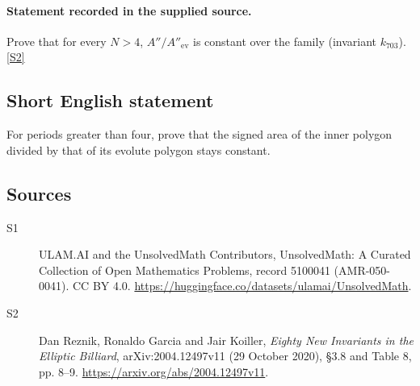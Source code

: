 \documentclass[11pt]{article}
\newcommand{\sref}[2]{\hyperlink{source:#1:#2}{[S#2]}}
\begin{document}
\paragraph{Statement recorded in the supplied source.}
Prove that for every $N>4$, $A''/A''_{\mathrm{ev}}$ is constant over the family (invariant $k_{703}$). \sref{5100041}{2}
\subsection{Short English statement}
For periods greater than four, prove that the signed area of the inner polygon divided by that of its evolute polygon stays constant.
\subsection{Sources}
\begin{description}
\item[\hypertarget{source:5100041:1}{S1}] ULAM.AI and the UnsolvedMath Contributors, UnsolvedMath: A Curated Collection of Open Mathematics Problems, record 5100041 (AMR-050-0041). CC BY 4.0. \url{https://huggingface.co/datasets/ulamai/UnsolvedMath}.
\item[\hypertarget{source:5100041:2}{S2}] Dan Reznik, Ronaldo Garcia and Jair Koiller, \emph{Eighty New Invariants in the Elliptic Billiard}, arXiv:2004.12497v11 (29 October 2020), \S3.8 and Table 8, pp. 8--9. \url{https://arxiv.org/abs/2004.12497v11}.
\end{description}
\label{end:5100041}
\end{document}
